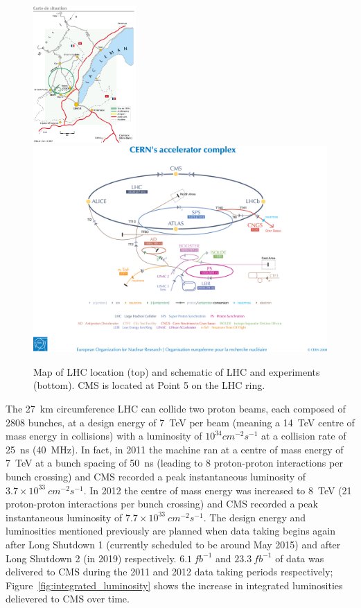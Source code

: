 \begin{figure}[hbtp]
   \centering
     \includegraphics[width=0.35\textwidth]{Chapters/03_Detector/Images/lhc-pho-1997-169.jpg}\\
     \includegraphics[width=\textwidth]{Chapters/03_Detector/Images/0812015.jpg}%
     \caption{Map of LHC location (top) and schematic of LHC and experiments (bottom). CMS is located at Point
     5 on the LHC ring.}
     \label{fig:LHC_and_CMS_map}
\end{figure}

The 27~km circumference LHC can collide two proton beams, each composed of 2808 bunches, at a design energy of
7~TeV per beam (meaning a 14~TeV centre of mass energy in collisions) with a luminosity of $10^{34}
cm^{-2}s^{-1}$ at a collision rate of 25~ns (40~MHz). In fact, in 2011 the machine ran at a centre of mass
energy of 7~TeV at a bunch spacing of 50~ns (leading to 8 proton-proton interactions per bunch crossing) and
CMS recorded a peak instantaneous luminosity of $3.7\times10^{33}~cm^{-2}s^{-1}$. In 2012 the centre of mass
energy was increased to 8~TeV (21 proton-proton interactions per bunch crossing) and CMS recorded a peak
instantaneous luminosity of $7.7\times10^{33}~cm^{-2}s^{-1}$. The design energy and luminosities mentioned
previously are planned when data taking begins again after Long Shutdown 1 (currently scheduled to be around
May 2015) and after Long Shutdown 2 (in 2019) respectively. $6.1~fb^{-1}$ and $23.3~fb^{-1}$ of data was
delivered to CMS during the 2011 and 2012 data taking periods respectively;
Figure~\ref{fig:integrated_luminosity} shows the increase in integrated luminosities delievered to CMS over
time.

